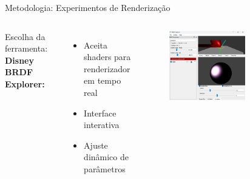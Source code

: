 \begin{frame}[fragile]{Metodologia: Experimentos de Renderização}
   \begin{columns}
       Escolha da ferramenta: \textbf{Disney BRDF Explorer:}
             \begin{itemize}
                 \item Aceita shaders para renderizador em tempo real
                 \item Interface interativa
                 \item Ajuste dinâmico de parâmetros
             \end{itemize}
       \begin{figure}
           \includegraphics[width=0.65\textwidth]{./Imagens/disney-brdf-tool-original2.png}
       \end{figure}

    \end{columns}
\end{frame}
